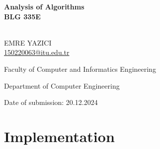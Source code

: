 \documentclass[12pt]{report}
\author{Emre YAZICI}
\numberwithin{figure}{chapter}
\begin{document}
\begin{titlepage}
\begin{center}
    \vspace*{-3cm}
    
    \vspace{2.3cm}
    

    \vspace{1cm}
    {\textbf{Analysis of Algorithms\\}}
    \vspace{0.3cm}
    {\textbf{BLG 335E\\}}
    \vspace{2.4cm}
    
    {}\\
    EMRE YAZICI \\ \href{mailto:150220063@itu.edu.tr}{150220063@itu.edu.tr}\\
    \vspace{0.9cm}

\end{center}
{\raggedleft\vfill{\begin{singlespace}
     Faculty of Computer and Informatics Engineering\\
\end{singlespace}
 Department of Computer Engineering\\
 \begin{singlespace}
 Date of submission: 20.12.2024\\
 
 
 \end{singlespace}
}\par
}
\end{titlepage}

\newpage

\chapter{Implementation}
 
\end{document}
